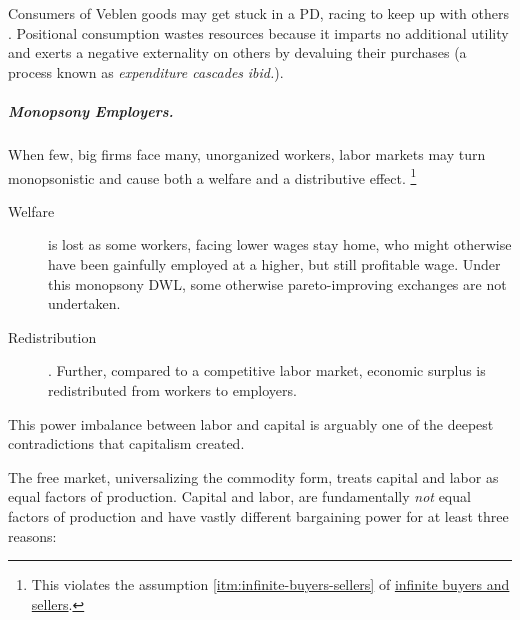 Consumers of Veblen goods may get stuck in a \gls{PD}, racing to keep up with others \citep{Frank1987}.
Positional consumption wastes resources because it imparts no additional utility and exerts a negative externality on others by devaluing their purchases (a process known as \emph{expenditure cascades} \emph{ibid.}).

\subparagraph[Monopsony Employers]{Monopsony Employers.} \label{sec:monopsony-employers} When few, big firms face many, unorganized workers, labor markets may turn monopsonistic and cause both a welfare and a distributive effect.
\footnote{
	This violates the  assumption \ref{itm:infinite-buyers-sellers} of \hyperref[itm:infinite-buyers-sellers]{infinite buyers and sellers}.
}
\begin{description}
	\item[Welfare] is lost as some workers, facing lower wages stay home, who might otherwise have been gainfully employed at a higher, but still profitable wage.
Under this monopsony \gls{DWL}, some otherwise pareto-improving exchanges are not undertaken.
	\item[Redistribution].
Further, compared to a competitive labor market, economic surplus is redistributed from workers to employers.
\end{description}

This power imbalance between labor and capital is arguably one of the deepest contradictions that capitalism created.

The free market, universalizing the commodity form, treats capital and labor as equal factors of production.
Capital and labor, are fundamentally \emph{not} equal factors of production and have vastly different bargaining power for at least three reasons:

